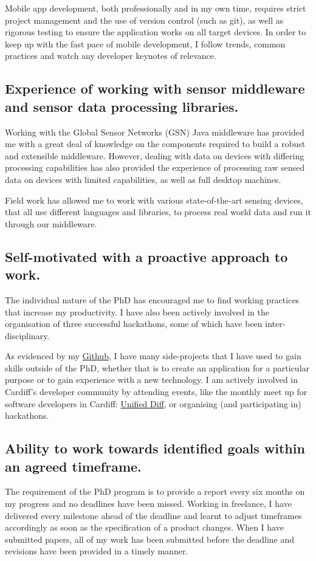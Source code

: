 \documentclass[10pt,a4paper]{article}
\begin{document}
Mobile app development, both professionally and in my own time, requires strict project management and the use of version control (such as git), as well as rigorous testing to ensure the application works on all target devices. In order to keep up with the fast pace of mobile development, I follow trends, common practices and watch any developer keynotes of relevance.

\subsection{Experience of working with sensor middleware and sensor data processing libraries.}
Working with the Global Sensor Networks (GSN) Java middleware has provided me with a great deal of knowledge on the components required to build a robust and extensible middleware. However, dealing with data on devices with differing processing capabilities has also provided the experience of processing raw sensed data on devices with limited capabilities, as well as full desktop machines.

Field work has allowed me to work with various state-of-the-art sensing devices, that all use different languages and libraries, to process real world data and run it through our middleware.

\subsection{Self-motivated with a proactive approach to work.}
The individual nature of the PhD has encouraged me to find working practices that increase my productivity. I have also been actively involved in the organisation of three successful hackathons, some of which have been inter-disciplinary.

As evidenced by my \href{http://github.com/encima/}{Github}, I have many side-projects that I have used to gain skills outside of the PhD, whether that is to create an application for a particular purpose or to gain experience with a new technology. I am actively involved in Cardiff's developer community by attending events, like the monthly meet up for software developers in Cardiff:  \href{http://unifieddiff.co.uk}{Unified Diff}, or organising (and participating in) hackathons.

\subsection{Ability to work towards identified goals within an agreed timeframe.}
The requirement of the PhD program is to provide a report every six months on my progress and no deadlines have been missed. Working in freelance, I have delivered every milestone ahead of the deadline and learnt to adjust timeframes accordingly as soon as the specification of a product changes. When I have submitted papers, all of my work has been submitted before the deadline and revisions have been provided in a timely manner.
\end{document}
